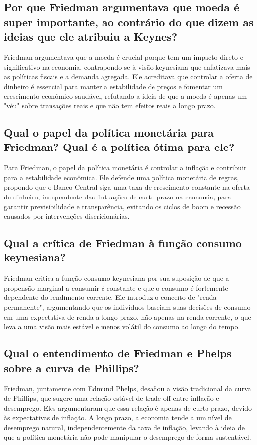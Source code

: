 \documentclass[a4paper,12pt]{article}[abntex2]
\begin{document}
\subsection{\textbf{ Por que Friedman argumentava que moeda é super importante, ao contrário do que dizem as ideias que ele atribuiu a Keynes?}}
Friedman argumentava que a moeda é crucial porque tem um impacto direto e significativo na economia, contrapondo-se à visão keynesiana que enfatizava mais as políticas fiscais e a demanda agregada. Ele acreditava que controlar a oferta de dinheiro é essencial para manter a estabilidade de preços e fomentar um crescimento econômico saudável, refutando a ideia de que a moeda é apenas um "véu" sobre transações reais e que não tem efeitos reais a longo prazo.

\subsection{\textbf{Qual o papel da política monetária para Friedman? Qual é a política ótima para ele?}}
Para Friedman, o papel da política monetária é controlar a inflação e contribuir para a estabilidade econômica. Ele defende uma política monetária de regras, propondo que o Banco Central siga uma taxa de crescimento constante na oferta de dinheiro, independente das flutuações de curto prazo na economia, para garantir previsibilidade e transparência, evitando os ciclos de boom e recessão causados por intervenções discricionárias.

\subsection{\textbf{Qual a crítica de Friedman à função consumo keynesiana?}}
Friedman critica a função consumo keynesiana por sua suposição de que a propensão marginal a consumir é constante e que o consumo é fortemente dependente do rendimento corrente. Ele introduz o conceito de "renda permanente", argumentando que os indivíduos baseiam suas decisões de consumo em uma expectativa de renda a longo prazo, não apenas na renda corrente, o que leva a uma visão mais estável e menos volátil do consumo ao longo do tempo.

\subsection{\textbf{Qual o entendimento de Friedman e Phelps sobre a curva de Phillips?}}
Friedman, juntamente com Edmund Phelps, desafiou a visão tradicional da curva de Phillips, que sugere uma relação estável de trade-off entre inflação e desemprego. Eles argumentaram que essa relação é apenas de curto prazo, devido às expectativas de inflação. A longo prazo, a economia tende a um nível de desemprego natural, independentemente da taxa de inflação, levando à ideia de que a política monetária não pode manipular o desemprego de forma sustentável.
\end{document}
